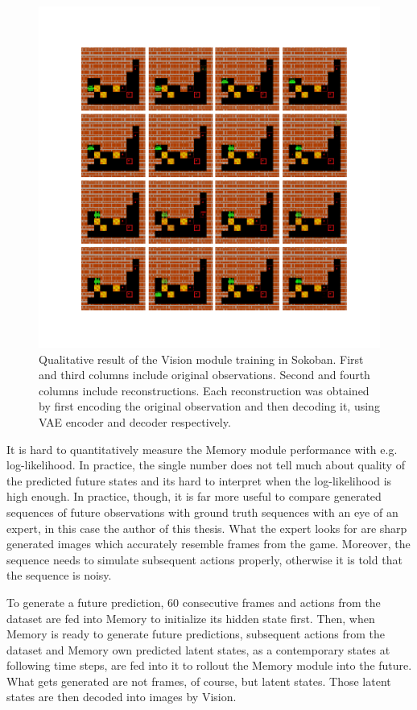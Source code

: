 \begin{figure}[H]
\includegraphics[width=1\textwidth,keepaspectratio]{figures/Sokoban_vision.png}
\caption[Qualitative result of the World Models' Vision module training in Sokoban]{Qualitative result of the Vision module training in Sokoban. First and third columns include original observations. Second and fourth columns include reconstructions. Each reconstruction was obtained by first encoding the original observation and then decoding it, using VAE encoder and decoder respectively.}
\label{Fig.WM_Sokoban_vision}
\end{figure}

It is hard to quantitatively measure the Memory module performance with e.g. log-likelihood. In practice, the single number does not tell much about quality of the predicted future states and its hard to interpret when the log-likelihood is high enough. In practice, though, it is far more useful to compare generated sequences of future observations with ground truth sequences with an eye of an expert, in this case the author of this thesis. What the expert looks for are sharp generated images which accurately resemble frames from the game. Moreover, the sequence needs to simulate subsequent actions properly, otherwise it is told that the sequence is noisy.

To generate a future prediction, 60 consecutive frames and actions from the dataset are fed into Memory to initialize its hidden state first. Then, when Memory is ready to generate future predictions, subsequent actions from the dataset and Memory own predicted latent states, as a contemporary states at following time steps, are fed into it to rollout the Memory module into the future. What gets generated are not frames, of course, but latent states. Those latent states are then decoded into images by Vision.

